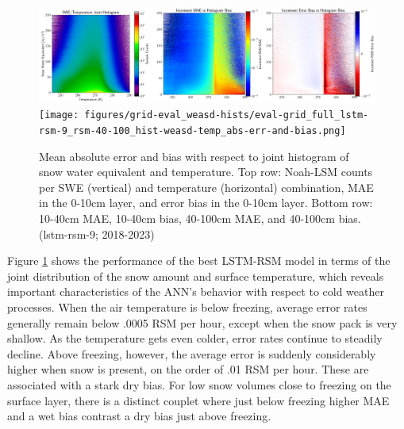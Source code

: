 \begin{figure}[h!]
    \centering

    \includegraphics[width=.99\linewidth,draft=false]{figures/grid-eval_weasd-hists/eval-grid_full_lstm-rsm-9_rsm-10_hist-weasd-temp_all-3.png}
    \texttt{[image: figures/grid-eval\_weasd-hists/eval-grid\_full\_lstm-rsm-9\_rsm-40-100\_hist-weasd-temp\_abs-err-and-bias.png]}

    \caption{Mean absolute error and bias with respect to joint histogram of snow water equivalent and temperature. Top row: Noah-LSM counts per SWE (vertical) and temperature (horizontal) combination, MAE in the 0-10cm layer, and error bias in the 0-10cm layer. Bottom row: 10-40cm MAE, 10-40cm bias, 40-100cm MAE, and 40-100cm bias. (lstm-rsm-9; 2018-2023)}
    \label{weasd-hists}
\end{figure}

Figure \ref{weasd-hists} shows the performance of the best LSTM-RSM model in terms of the joint distribution of the snow amount and surface temperature, which reveals important characteristics of the ANN's behavior with respect to cold weather processes. When the air temperature is below freezing, average error rates generally remain below .0005 RSM per hour, except when the snow pack is very shallow. As the temperature gets even colder, error rates continue to steadily decline. Above freezing, however, the average error is suddenly considerably higher when snow is present, on the order of .01 RSM per hour. These are associated with a stark dry bias. For low snow volumes close to freezing on the surface layer, there is a distinct couplet where just below freezing higher MAE and a wet bias contrast a dry bias just above freezing.

